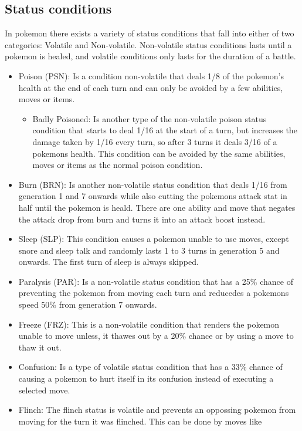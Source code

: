 \subsection{Status conditions}
In pokemon there exists a variety of status conditions that fall into either of two categories: Volatile and Non-volatile. Non-volatile status conditions
lasts until a pokemon is healed, and volatile conditions only lasts for the duration of a battle. \cite{StatusCondition}
\begin{itemize}
  \item Poison (PSN): Is a condition non-volatile that deals 1/8 of the pokemon's health at the end of each turn and can only be avoided by a few abilities,
  moves or items.
  \begin{itemize}
    \item Badly Poisoned: Is another type of the non-volatile poison status condition that starts to deal 1/16 at the start of a turn, 
      but increases the damage taken by 1/16 every turn, so after 3 turns it deals 3/16 of a pokemons health. 
      This condition can be avoided by the same abilities, moves or items as the normal poison condition.
  \end{itemize}
  \item Burn (BRN): Is another non-volatile status condition that deals 1/16 from generation 1 and 7 onwards while also cutting the pokemons attack stat
    in half until the pokemon is heald. There are one ability and move that negates the attack drop from burn and turns it into an attack boost instead.
  \item Sleep (SLP): This condition causes a pokemon unable to use moves, except snore and sleep talk and 
    randomly lasts 1 to 3 turns in generation 5 and onwards. The first turn of sleep is always skipped.
  \item Paralysis (PAR): Is a non-volatile status condition that has a 25\% chance of preventing the pokemon from moving each turn and reducedes a pokemons
    speed 50\% from generation 7 onwards.
  \item Freeze (FRZ): This is a non-volatile condition that renders the pokemon unable to move unless, it thawes out by a 20\% chance or 
    by using a move to thaw it out.
  \item Confusion: Is a type of volatile status condition that has a 33\% chance of causing a pokemon to hurt itself in its confusion instead of executing
    a selected move.
  \item Flinch: The flinch status is volatile and prevents an oppossing pokemon from moving for the turn it was flinched. This can be done by moves like 

\end{itemize}

